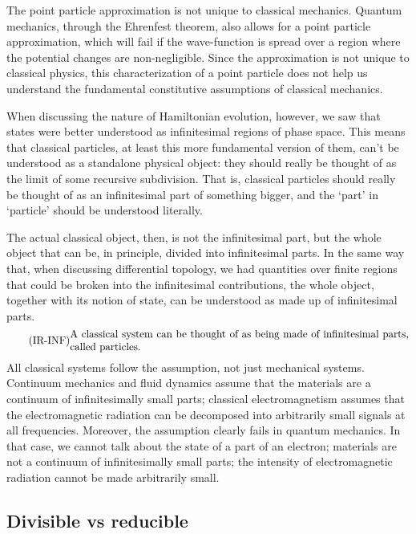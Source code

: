The point particle approximation is not unique to classical mechanics. Quantum mechanics, through the Ehrenfest theorem, also allows for a point particle approximation, which will fail if the wave-function is spread over a region where the potential changes are non-negligible. Since the approximation is not unique to classical physics, this characterization of a point particle does not help us understand the fundamental constitutive assumptions of classical mechanics.

When discussing the nature of Hamiltonian evolution, however, we saw that states were better understood as infinitesimal regions of phase space. This means that classical particles, at least this more fundamental version of them, can't be understood as a standalone physical object: they should really be thought of as the limit of some recursive subdivision. That is, classical particles should really be thought of as an infinitesimal part of something bigger, and the `part' in `particle' should be understood literally.

The actual classical object, then, is not the infinitesimal part, but the whole object that can be, in principle, divided into infinitesimal parts. In the same way that, when discussing differential topology, we had quantities over finite regions that could be broken into the infinitesimal contributions, the whole object, together with its notion of state, can be understood as made up of infinitesimal parts.
\begin{equation}\tag{IR-INF}\label{rp-cm-ir-condMadeOfInfinitesimalParts}
	\eqtext{A classical system can be thought of as being made of infinitesimal parts, called particles.}
\end{equation}
All classical systems follow the assumption, not just mechanical systems. Continuum mechanics and fluid dynamics assume that the materials are a continuum of infinitesimally small parts; classical electromagnetism assumes that the electromagnetic radiation can be decomposed into arbitrarily small signals at all frequencies. Moreover, the assumption clearly fails in quantum mechanics. In that case, we cannot talk about the state of a part of an electron; materials are not a continuum of infinitesimally small parts; the intensity of electromagnetic radiation cannot be made arbitrarily small.

\subsection{Divisible vs reducible}


